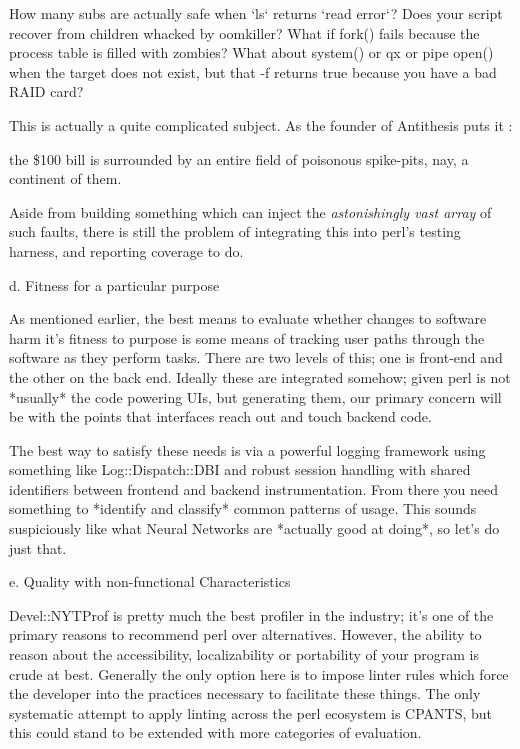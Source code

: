 \documentclass[twoside]{article}
\begin{document}
How many subs are actually safe when `ls` returns `read error`?
Does your script recover from children whacked by oomkiller?
What if fork() fails because the process table is filled with zombies?
What about system() or qx{} or pipe open() when the target does not exist, but that -f returns true because you have a bad RAID card?

This is actually a quite complicated subject.  As the founder of Antithesis puts it \cite{antithesis}:
\begin{displayquote}
the \$100 bill is surrounded by an entire field of poisonous spike-pits, nay, a continent of them.
\end{displayquote}
Aside from building something which can inject the \textit{astonishingly vast array} of such faults, there is still the problem of integrating this into perl's testing harness, and reporting coverage to do.

d. Fitness for a particular purpose

As mentioned earlier, the best means to evaluate whether changes to software harm it's fitness to purpose is some means of tracking user paths through the software as they perform tasks.
There are two levels of this; one is front-end and the other on the back end.
Ideally these are integrated somehow; given perl is not *usually* the code powering UIs, but generating them, our primary concern will be with the points that interfaces reach out and touch backend code.

The best way to satisfy these needs is via a powerful logging framework using something like Log::Dispatch::DBI and robust session handling with shared identifiers between frontend and backend instrumentation.
From there you need something to *identify and classify* common patterns of usage.
This sounds suspiciously like what Neural Networks are *actually good at doing*, so let's do just that.

e. Quality with non-functional Characteristics

Devel::NYTProf is pretty much the best profiler in the industry; it's one of the primary reasons to recommend perl over alternatives.
However, the ability to reason about the accessibility, localizability or portability of your program is crude at best.
Generally the only option here is to impose linter rules which force the developer into the practices necessary to facilitate these things.
The only systematic attempt to apply linting across the perl ecosystem is CPANTS, but this could stand to be extended with more categories of evaluation.
\end{document}
